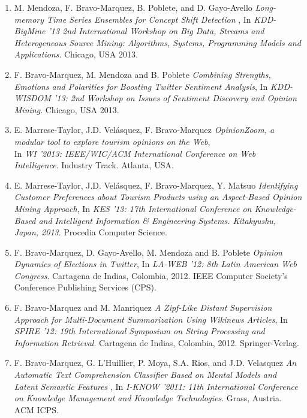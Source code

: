 \documentclass[letterpaper]{article}
\begin{document}
\begin{enumerate}
\item M. Mendoza, F. Bravo-Marquez, B. Poblete, and D. Gayo-Avello \textit{Long-memory Time Series Ensembles for Concept Shift Detection} , In \textit{KDD-BigMine '13 2nd International Workshop on Big Data, Streams and Heterogeneous Source Mining: Algorithms, Systems, Programming Models and Applications}. Chicago, USA 2013.

\item F. Bravo-Marquez, M. Mendoza and B. Poblete \textit{Combining Strengths, Emotions and Polarities for Boosting Twitter Sentiment Analysis}, In \textit{KDD-WISDOM '13: 2nd Workshop on Issues of Sentiment Discovery and Opinion Mining}. Chicago, USA 2013. 

\item E. Marrese-Taylor, J.D. Velásquez, F. Bravo-Marquez \textit{OpinionZoom, a modular tool to explore tourism opinions on the Web}, \\
In \textit{WI '2013: IEEE/WIC/ACM International Conference on Web Intelligence}. Industry Track. Atlanta, USA. 

\item E. Marrese-Taylor, J.D. Velásquez, F. Bravo-Marquez, Y. Matsuo \textit{Identifying Customer Preferences about Tourism Products using an Aspect-Based Opinion Mining Approach}, In \textit{KES '13: 17th International Conference on Knowledge-Based and Intelligent Information \& Engineering Systems. Kitakyushu, Japan, 2013}. Procedia Computer Science. 

\item F. Bravo-Marquez, D. Gayo-Avello, M. Mendoza and B. Poblete \textit{Opinion Dynamics of Elections in Twitter}, In \textit{LA-WEB '12: 8th Latin American Web Congress}. Cartagena de Indias, Colombia, 2012. IEEE Computer Society's Conference Publishing Services (CPS).

\item F. Bravo-Marquez and M. Manriquez \textit{A Zipf-Like Distant Supervision Approach for Multi-Document Summarization Using Wikinews Articles}, In \textit{SPIRE '12: 19th International Symposium on String Processing and Information Retrieval}. Cartagena de Indias, Colombia, 2012. Springer-Verlag.

\item F. Bravo-Marquez, G. L'Huillier, P. Moya, S.A. Rios, and J.D. Velasquez  \textit{An Automatic Text Comprehension Classifier Based on Mental Models and Latent Semantic Features} , In \textit{I-KNOW '2011: 11th International Conference on Knowledge Management and Knowledge Technologies}. Grass, Austria. ACM ICPS.


\end{enumerate}
\end{document}
